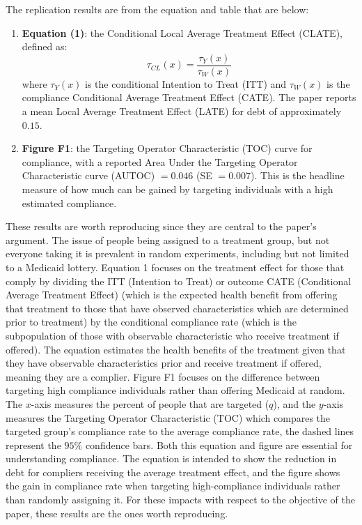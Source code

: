 \documentclass[12pt]{article}
\begin{document}
The replication results are from the equation and table that are below:

\begin{enumerate}

    \item \textbf{Equation (1)}: the Conditional Local Average Treatment Effect
    (CLATE), defined as:
    \begin{equation}
        \tau_{CL}(x) = \frac{\tau_Y(x)}{\tau_W(x)}
    \end{equation}
    where $\tau_Y(x)$ is the conditional Intention to Treat (ITT) and $\tau_W(x)$ is the compliance
    Conditional Average Treatment Effect (CATE). The paper reports a mean Local Average Treatment Effect (LATE) for debt of approximately $0.15$.

    \item \textbf{Figure F1}: the Targeting Operator Characteristic (TOC) curve
    for compliance, with a reported Area Under the Targeting Operator Characteristic curve (AUTOC) $= 0.046$ (SE $= 0.007$). This is the
    headline measure of how much can be gained by targeting individuals with
    a high estimated compliance.

\end{enumerate}

These results are worth reproducing since they are central to the paper's argument. The issue of people being assigned to a treatment group, but not everyone taking it is prevalent in random experiments, including but not limited to a Medicaid lottery. Equation 1 focuses on the treatment effect for those that comply by dividing the ITT (Intention to Treat) or outcome CATE (Conditional Average Treatment Effect) (which is the expected health benefit from offering that treatment to those that have observed characteristics which are determined prior to treatment) by the conditional compliance rate (which is the subpopulation of those with observable characteristic who receive treatment if offered). The equation estimates the health benefits of the treatment given that they have observable characteristics prior and receive treatment if offered, meaning they are a complier. Figure F1 focuses on the difference between targeting high compliance individuals rather than offering Medicaid at random. The $x$-axis measures the percent of people that are targeted ($q$), and the $y$-axis measures the Targeting Operator Characteristic (TOC) which compares the targeted group's compliance rate to the average compliance rate, the dashed lines represent the $95\%$ confidence bars. Both this equation and figure are essential for understanding compliance. The equation is intended to show the reduction in debt for compliers receiving the average treatment effect, and the figure shows the gain in compliance rate when targeting high-compliance individuals rather than randomly assigning it. For these impacts with respect to the objective of the paper, these results are the ones worth reproducing.
\end{document}
